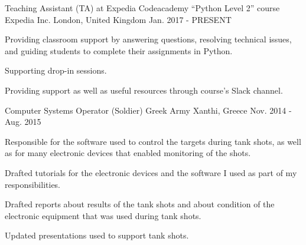 

\begin{cventries}


  \cventry
    {Teaching Assistant (TA) at Expedia Codeacademy ``Python Level 2'' course} %
    {Expedia Inc.} %
    {London, United Kingdom} %
    {Jan. 2017 - PRESENT} %
    {
      \begin{cvitems} %
        \item {Providing classroom support by answering questions, resolving technical issues, and guiding students to complete their assignments in Python.}
        \item {Supporting drop-in sessions.}
        \item {Providing support as well as useful resources through course's Slack channel.}
      \end{cvitems}
    } 
  \cventry
    {Computer Systems Operator (Soldier)} %
    {Greek Army} %
    {Xanthi, Greece} %
    {Nov. 2014 - Aug. 2015} %
    {
      \begin{cvitems} %
      	\item {Responsible for the software used to control the targets during tank shots, as well as for many electronic devices that enabled monitoring of the shots.}
      	\item {Drafted tutorials for the electronic devices and the software I used as part of my responsibilities.}
      	\item {Drafted reports about results of the tank shots and about condition of the electronic equipment that was used during tank shots.}
        \item {Updated presentations used to support tank shots.}
      \end{cvitems}
    }
    

\end{cventries}
